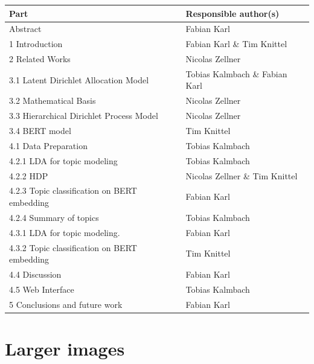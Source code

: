 \documentclass[sigconf,nonacm, 11pt]{acmart}
\begin{document}
\begin{tabularx}{\linewidth}{X|X}
\textbf{Part}                                  & \textbf{Responsible author(s)} \\ \hline
Abstract                                       & Fabian Karl                    \\
1 Introduction                                 & Fabian Karl \& Tim Knittel     \\
2 Related Works                                & Nicolas Zellner                \\
3.1 Latent Dirichlet Allocation Model          & Tobias Kalmbach \& Fabian Karl \\
3.2 Mathematical Basis                         & Nicolas Zellner                \\
3.3 Hierarchical Dirichlet Process Model       & Nicolas Zellner                \\
3.4 BERT model                                 & Tim Knittel                    \\
4.1 Data Preparation                           & Tobias Kalmbach                \\
4.2.1 LDA for topic modeling                   & Tobias Kalmbach                \\
4.2.2  HDP                                     & Nicolas Zellner \& Tim Knittel \\
4.2.3 Topic classification on BERT embedding   & Fabian Karl                    \\
4.2.4  Summary of topics                       & Tobias Kalmbach                \\
4.3.1  LDA for topic modeling.                 & Fabian Karl                    \\
4.3.2  Topic classification on BERT embedding  & Tim Knittel                    \\
4.4 Discussion                                 & Fabian Karl                    \\
4.5  Web Interface                             & Tobias Kalmbach                \\
5 Conclusions and future work                  & Fabian Karl                   
\end{tabularx}

\section{Larger images}
\end{document}
